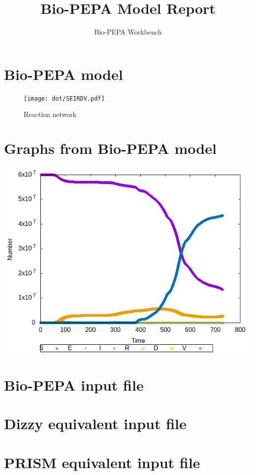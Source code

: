 \documentclass{llncs}
\title{Bio-PEPA Model Report}
\author{Bio-PEPA Workbench}
\institute{\today}
\begin{document}
\maketitle
\section{Bio-PEPA model}

\begin{figure}[htbp]
\begin{center}
\texttt{[image: dot/SEIRDV.pdf]}
\caption{Reaction network}
\end{center}
\end{figure}
\newpage
\section{Graphs from Bio-PEPA model}
\includegraphics[scale=1]{png/SEIRDV001_sundials_results_0}
\appendix
\newpage
\section{Bio-PEPA input file}

\newpage
\section{Dizzy equivalent input file}

\newpage
\section{PRISM equivalent input file}

\end{document}
